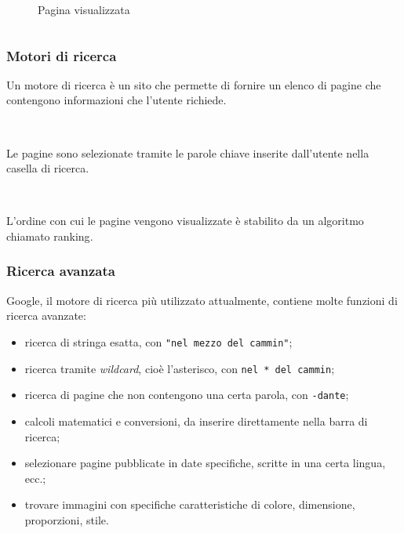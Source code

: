 \documentclass[]{beamer}
\begin{document}
\begin{frame}
\begin{columns}
\begin{column}{0.45\textwidth}
\begin{figure}
{  Pagina visualizzata}
  \end{figure}
  \end{column}
\end{columns}
\end{frame}



\begin{frame}
\frametitle{Motori di ricerca}
Un motore di ricerca è un sito che permette di fornire un \alert<1>{elenco di pagine} che contengono informazioni che l'utente richiede.\pause

~

Le pagine sono selezionate tramite le \alert<2>{parole chiave} inserite dall'utente nella \alert<2>{casella di ricerca}.\pause

~

L'ordine con cui le pagine vengono visualizzate è stabilito da un algoritmo chiamato \alert<3>{ranking}.
\end{frame}



\begin{frame}
\frametitle{Ricerca avanzata}
Google, il motore di ricerca più utilizzato attualmente, contiene molte funzioni di ricerca avanzate:\pause
\begin{itemize}
  \item ricerca di stringa esatta, con \texttt{"nel mezzo del cammin"};\pause
  \item ricerca tramite \emph{wildcard}, cioè l'asterisco, con \texttt{nel * del cammin};\pause
  \item ricerca di pagine che non contengono una certa parola, con \texttt{-dante};\pause
  \item calcoli matematici e conversioni, da inserire direttamente nella barra di ricerca;\pause
  \item selezionare pagine pubblicate in date specifiche, scritte in una certa lingua, ecc.;\pause
  \item trovare immagini con specifiche caratteristiche di colore, dimensione, proporzioni, stile. 
\end{itemize}
\end{frame}
\end{document}
